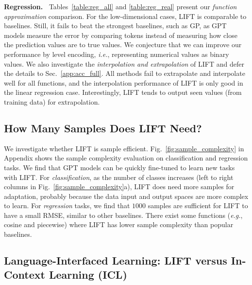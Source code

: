 \textbf{Regression.~}
Tables~\ref{table:reg_all} and \ref{table:reg_real} present our \textit{function approximation} comparison. For the low-dimensional cases, \textsc{LIFT} is comparable to baselines. Still, it fails to beat the strongest baselines, such as GP, as GPT models measure the error by comparing tokens instead of measuring how close the prediction values are to true values. We conjecture that we can improve our performance by level encoding, {\it i.e.}, representing numerical values as binary values. We also investigate the \textit{interpolation and extrapolation} of \textsc{LIFT} and defer the details to Sec.~\ref{app:acc_full}.
All methods fail to extrapolate and interpolate well for all functions, and the interpolation performance of \textsc{LIFT} is only good in the linear regression case. Interestingly, \textsc{LIFT} tends to output seen values (from training data) for extrapolation. 

\subsection{How Many Samples Does \textsc{LIFT} Need?}

\label{sec:sample_complexity}

We investigate whether \textsc{LIFT} is sample efficient.
Fig.~\ref{fig:sample_complexity} in Appendix shows the sample complexity evaluation on classification and regression tasks. We find that GPT models can be quickly fine-tuned to learn new tasks with \textsc{LIFT}.
For \textit{classification}, as the number of classes increases (left to right columns in Fig.~\ref{fig:sample_complexity}a), \textsc{LIFT} does need more samples for adaptation, probably because the data input and output spaces are more complex to learn. For \textit{regression} tasks, we find that $1000$ samples are sufficient for \textsc{LIFT} to have a small RMSE, similar to other baselines. There exist some functions (\textit{e.g.}, cosine and piecewise) where \textsc{LIFT} has lower sample complexity than popular baselines. 

\subsection{Language-Interfaced Learning: \textsc{LIFT} versus In-Context Learning (ICL)}

\label{sec:ft_vs_icl}

